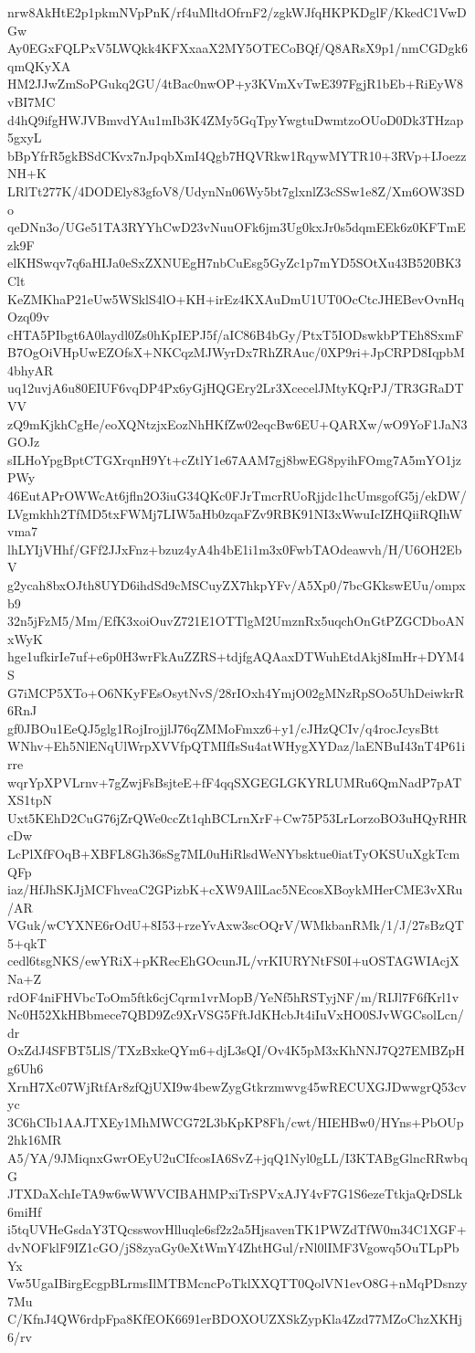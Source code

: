 nrw8AkHtE2p1pkmNVpPnK/rf4uMltdOfrnF2/zgkWJfqHKPKDglF/KkedC1VwDGw
Ay0EGxFQLPxV5LWQkk4KFXxaaX2MY5OTECoBQf/Q8ARsX9p1/nmCGDgk6qmQKyXA
HM2JJwZmSoPGukq2GU/4tBac0nwOP+y3KVmXvTwE397FgjR1bEb+RiEyW8vBI7MC
d4hQ9ifgHWJVBmvdYAu1mIb3K4ZMy5GqTpyYwgtuDwmtzoOUoD0Dk3THzap5gxyL
bBpYfrR5gkBSdCKvx7nJpqbXmI4Qgb7HQVRkw1RqywMYTR10+3RVp+IJoezzNH+K
LRlTt277K/4DODEly83gfoV8/UdynNn06Wy5bt7glxnlZ3cSSw1e8Z/Xm6OW3SDo
qeDNn3o/UGe51TA3RYYhCwD23vNuuOFk6jm3Ug0kxJr0s5dqmEEk6z0KFTmEzk9F
elKHSwqv7q6aHIJa0eSxZXNUEgH7nbCuEsg5GyZc1p7mYD5SOtXu43B520BK3Clt
KeZMKhaP21eUw5WSklS4lO+KH+irEz4KXAuDmU1UT0OcCtcJHEBevOvnHqOzq09v
cHTA5PIbgt6A0laydl0Zs0hKpIEPJ5f/aIC86B4bGy/PtxT5IODswkbPTEh8SxmF
B7OgOiVHpUwEZOfsX+NKCqzMJWyrDx7RhZRAuc/0XP9ri+JpCRPD8IqpbM4bhyAR
uq12uvjA6u80EIUF6vqDP4Px6yGjHQGEry2Lr3XcecelJMtyKQrPJ/TR3GRaDTVV
zQ9mKjkhCgHe/eoXQNtzjxEozNhHKfZw02eqcBw6EU+QARXw/wO9YoF1JaN3GOJz
sILHoYpgBptCTGXrqnH9Yt+cZtlY1e67AAM7gj8bwEG8pyihFOmg7A5mYO1jzPWy
46EutAPrOWWcAt6jfln2O3iuG34QKc0FJrTmcrRUoRjjdc1hcUmsgofG5j/ekDW/
LVgmkhh2TfMD5txFWMj7LIW5aHb0zqaFZv9RBK91NI3xWwuIcIZHQiiRQIhWvma7
lhLYIjVHhf/GFf2JJxFnz+bzuz4yA4h4bE1i1m3x0FwbTAOdeawvh/H/U6OH2EbV
g2ycah8bxOJth8UYD6ihdSd9cMSCuyZX7hkpYFv/A5Xp0/7bcGKkswEUu/ompxb9
32n5jFzM5/Mm/EfK3xoiOuvZ721E1OTTlgM2UmznRx5uqchOnGtPZGCDboANxWyK
hge1ufkirIe7uf+e6p0H3wrFkAuZZRS+tdjfgAQAaxDTWuhEtdAkj8ImHr+DYM4S
G7iMCP5XTo+O6NKyFEsOsytNvS/28rIOxh4YmjO02gMNzRpSOo5UhDeiwkrR6RnJ
gf0JBOu1EeQJ5glg1RojIrojjlJ76qZMMoFmxz6+y1/cJHzQCIv/q4rocJcysBtt
WNhv+Eh5NlENqUlWrpXVVfpQTMIfIsSu4atWHygXYDaz/laENBuI43nT4P61irre
wqrYpXPVLrnv+7gZwjFsBsjteE+fF4qqSXGEGLGKYRLUMRu6QmNadP7pATXS1tpN
Uxt5KEhD2CuG76jZrQWe0ccZt1qhBCLrnXrF+Cw75P53LrLorzoBO3uHQyRHRcDw
LcPlXfFOqB+XBFL8Gh36sSg7ML0uHiRlsdWeNYbsktue0iatTyOKSUuXgkTcmQFp
iaz/HfJhSKJjMCFhveaC2GPizbK+cXW9AIlLac5NEcosXBoykMHerCME3vXRu/AR
VGuk/wCYXNE6rOdU+8I53+rzeYvAxw3scOQrV/WMkbanRMk/1/J/27sBzQT5+qkT
cedl6tsgNKS/ewYRiX+pKRecEhGOcunJL/vrKIURYNtFS0I+uOSTAGWIAcjXNa+Z
rdOF4niFHVbcToOm5ftk6cjCqrm1vrMopB/YeNf5hRSTyjNF/m/RIJl7F6fKrl1v
Nc0H52XkHBbmece7QBD9Zc9XrVSG5FftJdKHcbJt4iIuVxHO0SJvWGCsolLcn/dr
OxZdJ4SFBT5LlS/TXzBxkeQYm6+djL3sQI/Ov4K5pM3xKhNNJ7Q27EMBZpHg6Uh6
XrnH7Xc07WjRtfAr8zfQjUXI9w4bewZygGtkrzmwvg45wRECUXGJDwwgrQ53cvyc
3C6hCIb1AAJTXEy1MhMWCG72L3bKpKP8Fh/cwt/HIEHBw0/HYns+PbOUp2hk16MR
A5/YA/9JMiqnxGwrOEyU2uCIfcosIA6SvZ+jqQ1Nyl0gLL/I3KTABgGlncRRwbqG
JTXDaXchIeTA9w6wWWVCIBAHMPxiTrSPVxAJY4vF7G1S6ezeTtkjaQrDSLk6miHf
i5tqUVHeGsdaY3TQcsswovHlluqle6sf2z2a5HjsavenTK1PWZdTfW0m34C1XGF+
dvNOFklF9IZ1cGO/jS8zyaGy0eXtWmY4ZhtHGul/rNl0lIMF3Vgowq5OuTLpPbYx
Vw5UgaIBirgEcgpBLrmsIlMTBMcncPoTklXXQTT0QolVN1evO8G+nMqPDsnzy7Mu
C/KfnJ4QW6rdpFpa8KfEOK6691erBDOXOUZXSkZypKla4Zzd77MZoChzXKHj6/rv
